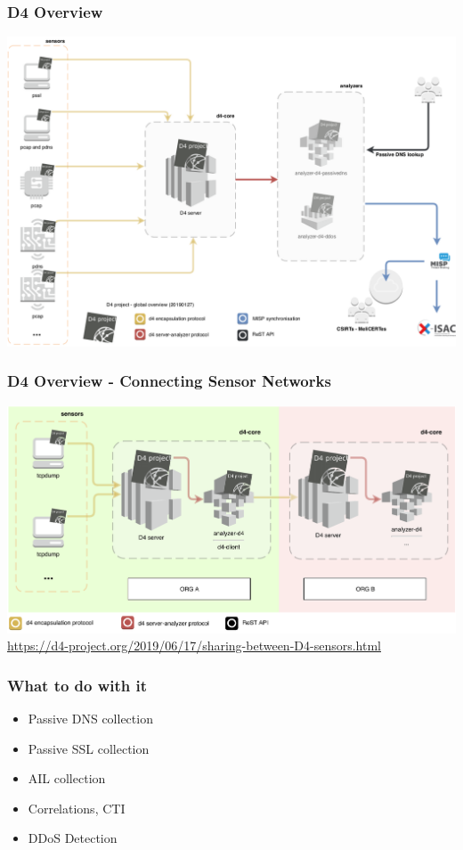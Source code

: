 \documentclass{beamer}
\begin{document}
\begin{frame}
\frametitle{D4 Overview}
        \includegraphics[scale=0.38]{../../diagram/d4-overview.png}
\end{frame}

\begin{frame}
\frametitle{D4 Overview - Connecting Sensor Networks}
        \includegraphics[scale=0.46]{../../diagram/mixing-d4-1.pdf}
        {\tiny \url{https://d4-project.org/2019/06/17/sharing-between-D4-sensors.html}}
\end{frame}

\begin{frame}
        \frametitle{What to do with it}
        \begin{itemize}
                \item Passive DNS collection
                \item Passive SSL collection
                \item AIL collection  
                \item Correlations, CTI
                \item DDoS Detection 
        \end{itemize}
\end{frame}
\end{document}
